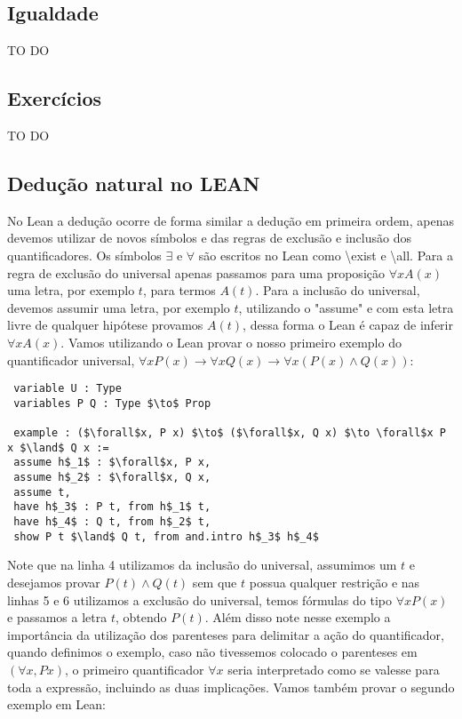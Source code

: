 \subsection{Igualdade}
TO DO 
\subsection{Exercícios}
TO DO
\subsection{Dedução natural no LEAN}
No Lean a dedução ocorre de forma similar a dedução em primeira ordem, apenas devemos utilizar de novos símbolos e das 
regras de exclusão e inclusão dos quantificadores. Os símbolos $\exists $ e $\forall $ são escritos no Lean como \textbackslash exist 
e  \textbackslash all. Para a regra de exclusão do universal apenas passamos para uma proposição $\forall x A(x)$ uma letra,
por exemplo $t$, para termos $A(t)$. Para a inclusão do universal, devemos assumir uma letra, por exemplo $t$, utilizando o
"assume" e com esta letra livre de qualquer hipótese provamos $A(t)$, dessa forma o Lean é capaz de inferir $\forall x A(x)$.
\newline Vamos utilizando o Lean provar o nosso primeiro exemplo do quantificador universal, $\forall xP(x) \to \forall x Q(x) \to \forall x(P(x) \land Q(x))$:
\begin{lstlisting}
 variable U : Type
 variables P Q : Type $\to$ Prop

 example : ($\forall$x, P x) $\to$ ($\forall$x, Q x) $\to \forall$x P x $\land$ Q x :=  
 assume h$_1$ : $\forall$x, P x,
 assume h$_2$ : $\forall$x, Q x,
 assume t,
 have h$_3$ : P t, from h$_1$ t,
 have h$_4$ : Q t, from h$_2$ t,
 show P t $\land$ Q t, from and.intro h$_3$ h$_4$ 
\end{lstlisting}
Note que na linha 4 utilizamos da inclusão do universal, assumimos um $t$ e desejamos provar $P(t) \land Q(t)$ 
sem que $t$ possua qualquer restrição e nas linhas 5 e 6 utilizamos a exclusão do universal, temos fórmulas do
tipo $\forall x P(x)$ e passamos a letra $t$, obtendo $P(t)$. Além disso note nesse exemplo a importância da utilização
dos parenteses para delimitar a ação do quantificador, quando definimos o exemplo, caso não tivessemos colocado
o parenteses em  $(\forall x, P x)$, o primeiro quantificador $\forall x$ seria interpretado como se valesse para toda
a expressão, incluindo as duas implicações.
\newline Vamos também provar o segundo exemplo em Lean:
